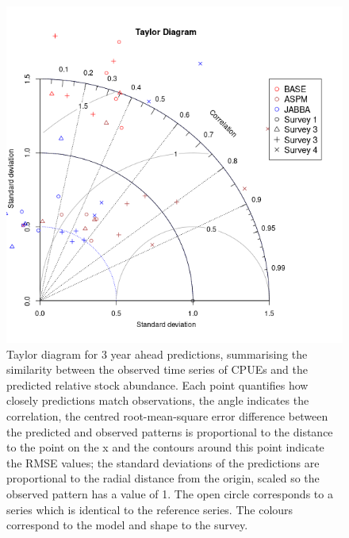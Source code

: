 \documentclass[a4paper]{article}
\begin{document}
\begin{figure}[htbp]
\centering
\includegraphics[width=6in]{final-taylor-hy-1.png}
\caption{Taylor diagram for 3 year ahead predictions, summarising the similarity between the observed time series of CPUEs and the predicted relative stock abundance. Each point quantifies how closely predictions match observations, the angle indicates the correlation, the centred root-mean-square error difference between the predicted and observed patterns is proportional to the distance to the point on the x and the contours around this point indicate the RMSE values; the standard deviations of the predictions are proportional to the radial distance from the origin, scaled so the observed pattern has a value of 1. The open circle corresponds to a series which is identical to the reference series. The colours correspond to the model and shape to the survey.}
\label{fig:tdhat}
\end{figure}


\end{document}
